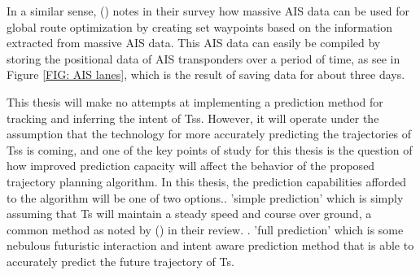 In a similar sense, (\cite{zhang2021collision}) notes in their survey how massive AIS data can be used for global route optimization by
creating set waypoints based on the information extracted from massive AIS data.
This AIS data can easily be compiled by storing the positional data of AIS transponders over a period of time, as see in Figure \ref{FIG: AIS lanes}, which
is the result of saving data for about three days.


This thesis will make no attempts at implementing a prediction method for tracking and inferring the intent of \gls{Ts}s. However, it will
operate under the assumption that the technology for more accurately predicting the trajectories of \gls{Ts}s is coming, and one of the key points
of study for this thesis is the question of how improved prediction capacity will affect the behavior of the proposed trajectory planning algorithm.
In this thesis, the prediction capabilities afforded to the algorithm will be one of two options.. 'simple prediction' which is simply assuming that \gls{Ts} will maintain a steady speed and course over ground, 
a common method as noted by (\cite{huang2020ship}) in their review. . 'full prediction' which is some nebulous futuristic interaction and intent aware prediction method that is able to accurately predict the
future trajectory of \gls{Ts}.




\newpage